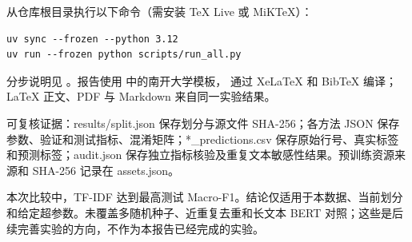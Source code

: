 从仓库根目录执行以下命令（需安装 TeX Live 或 MiKTeX）：
\begin{lstlisting}[numbers=none,aboveskip=4pt,belowskip=4pt]
uv sync --frozen --python 3.12
uv run --frozen python scripts/run_all.py
\end{lstlisting}
分步说明见 。报告使用  中的南开大学模板，
通过 XeLaTeX 和 BibTeX 编译；LaTeX 正文、PDF 与 Markdown 来自同一实验结果。

可复核证据：results/split.json 保存划分与源文件 SHA-256；各方法 JSON 保存参数、验证和测试指标、混淆矩阵；*\_predictions.csv 保存原始行号、真实标签和预测标签；audit.json 保存独立指标核验及重复文本敏感性结果。预训练资源来源和 SHA-256 记录在 assets.json。

本次比较中，TF-IDF 达到最高测试 Macro-F1。结论仅适用于本数据、当前划分和给定超参数。未覆盖多随机种子、近重复去重和长文本 BERT 对照；这些是后续完善实验的方向，不作为本报告已经完成的实验。

\clearpage
{}

